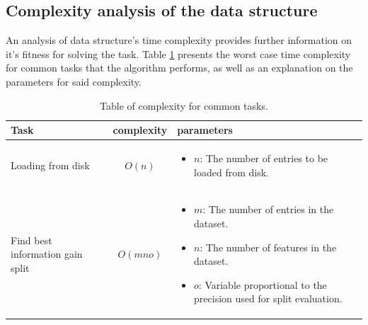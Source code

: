 \documentclass{acm_proc_article-sp}
\begin{document}
\subsection{Complexity analysis of the data structure}
An analysis of data structure's time complexity provides further information on it's fitness for solving the task. Table \ref{table:3} presents the worst case time complexity for common tasks that the algorithm performs, as well as an explanation on the parameters for said complexity.
\begin{table}[h]
  \centering
  \begin{tabular}{|p{}|c|p{}|}
    \hline
    Task                             & complexity         & parameters   \\ \hline
    Loading from disk                & $O(n)$      & \begin{itemize}[leftmargin=*]
    \item $n$: The number of entries to be loaded from disk.
    \end{itemize}   \\ \hline
    Find best information gain split & $O(mno)$    & \begin{itemize}[leftmargin=*]
    \item $m$: The number of entries in the dataset.
    \item $n$: The number of features in the dataset.
    \item $o$: Variable proportional to the precision used for split evaluation.
    \end{itemize}   \\ \hline
  \end{tabular}
  \caption{Table of complexity for common tasks.}
  \label{table:3}
\end{table}
\end{document}
